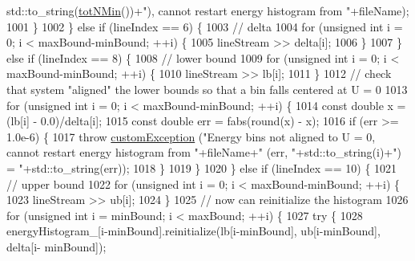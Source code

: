 \begin{DoxyCode}
      std::to\_string(\hyperlink{classsim_system_af10842e0eaa638373b8717c87b47e6bc}{totNMin}())+\textcolor{stringliteral}{"), cannot restart energy histogram from "}+fileName);
1001             \}
1002         \} \textcolor{keywordflow}{else} \textcolor{keywordflow}{if} (lineIndex == 6) \{
1003             \textcolor{comment}{// delta}
1004             \textcolor{keywordflow}{for} (\textcolor{keywordtype}{unsigned} \textcolor{keywordtype}{int} i = 0; i < maxBound-minBound; ++i) \{
1005                 lineStream >> delta[i];
1006             \}
1007         \} \textcolor{keywordflow}{else} \textcolor{keywordflow}{if} (lineIndex == 8) \{
1008             \textcolor{comment}{// lower bound}
1009             \textcolor{keywordflow}{for} (\textcolor{keywordtype}{unsigned} \textcolor{keywordtype}{int} i = 0; i < maxBound-minBound; ++i) \{
1010                 lineStream >> lb[i];
1011             \}
1012             \textcolor{comment}{// check that system "aligned" the lower bounds so that a bin falls centered at U = 0}
1013             \textcolor{keywordflow}{for} (\textcolor{keywordtype}{unsigned} \textcolor{keywordtype}{int} i = 0; i < maxBound-minBound; ++i) \{
1014                 \textcolor{keyword}{const} \textcolor{keywordtype}{double} x = (lb[i] - 0.0)/delta[i];
1015                 \textcolor{keyword}{const} \textcolor{keywordtype}{double} err = fabs(round(x) - x);
1016                 \textcolor{keywordflow}{if} (err >= 1.0e-6) \{
1017                     \textcolor{keywordflow}{throw} \hyperlink{classcustom_exception}{customException} (\textcolor{stringliteral}{"Energy bins not aligned to U = 0, cannot restart
       energy histogram from "}+fileName+\textcolor{stringliteral}{" (err, "}+std::to\_string(i)+\textcolor{stringliteral}{") = "}+std::to\_string(err));
1018                 \}
1019             \}
1020         \} \textcolor{keywordflow}{else} \textcolor{keywordflow}{if} (lineIndex == 10) \{
1021             \textcolor{comment}{// upper bound}
1022             \textcolor{keywordflow}{for} (\textcolor{keywordtype}{unsigned} \textcolor{keywordtype}{int} i = 0; i < maxBound-minBound; ++i) \{
1023                 lineStream >> ub[i];
1024             \}
1025             \textcolor{comment}{// now can reinitialize the histogram}
1026             \textcolor{keywordflow}{for} (\textcolor{keywordtype}{unsigned} \textcolor{keywordtype}{int} i = minBound; i < maxBound; ++i) \{
1027                 \textcolor{keywordflow}{try} \{
1028                     energyHistogram\_[i-minBound].reinitialize(lb[i-minBound], ub[i-minBound], delta[i-
      minBound]);

\end{DoxyCode}
